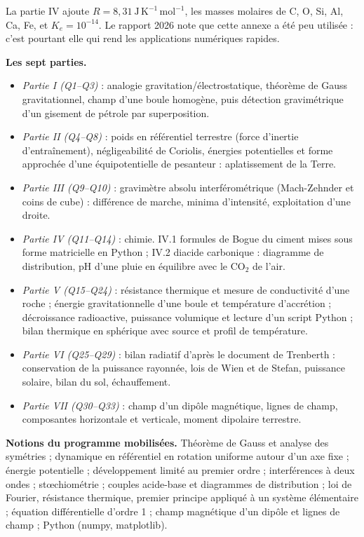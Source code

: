 \documentclass[11pt,a4paper]{article}
\providecommand{\tightlist}{\setlength{\itemsep}{0pt}\setlength{\parskip}{0pt}}
\begin{document}
La partie IV ajoute \(R=8{,}31\ \mathrm{J\,K^{-1}\,mol^{-1}}\), les masses molaires de C, O, Si, Al, Ca, Fe, et \(K_e=10^{-14}\). Le rapport 2026 note que cette annexe a été peu utilisée : c'est pourtant elle qui rend les applications numériques rapides.

\textbf{Les sept parties.}

\begin{itemize}
\tightlist
\item
  \emph{Partie I (Q1--Q3)} : analogie gravitation/électrostatique, théorème de Gauss gravitationnel, champ d'une boule homogène, puis détection gravimétrique d'un gisement de pétrole par superposition.
\item
  \emph{Partie II (Q4--Q8)} : poids en référentiel terrestre (force d'inertie d'entraînement), négligeabilité de Coriolis, énergies potentielles et forme approchée d'une équipotentielle de pesanteur : aplatissement de la Terre.
\item
  \emph{Partie III (Q9--Q10)} : gravimètre absolu interférométrique (Mach-Zehnder et coins de cube) : différence de marche, minima d'intensité, exploitation d'une droite.
\item
  \emph{Partie IV (Q11--Q14)} : chimie. IV.1 formules de Bogue du ciment mises sous forme matricielle en Python ; IV.2 diacide carbonique : diagramme de distribution, pH d'une pluie en équilibre avec le \(\mathrm{CO_2}\) de l'air.
\item
  \emph{Partie V (Q15--Q24)} : résistance thermique et mesure de conductivité d'une roche ; énergie gravitationnelle d'une boule et température d'accrétion ; décroissance radioactive, puissance volumique et lecture d'un script Python ; bilan thermique en sphérique avec source et profil de température.
\item
  \emph{Partie VI (Q25--Q29)} : bilan radiatif d'après le document de Trenberth : conservation de la puissance rayonnée, lois de Wien et de Stefan, puissance solaire, bilan du sol, échauffement.
\item
  \emph{Partie VII (Q30--Q33)} : champ d'un dipôle magnétique, lignes de champ, composantes horizontale et verticale, moment dipolaire terrestre.
\end{itemize}

\textbf{Notions du programme mobilisées.} Théorème de Gauss et analyse des symétries ; dynamique en référentiel en rotation uniforme autour d'un axe fixe ; énergie potentielle ; développement limité au premier ordre ; interférences à deux ondes ; stœchiométrie ; couples acide-base et diagrammes de distribution ; loi de Fourier, résistance thermique, premier principe appliqué à un système élémentaire ; équation différentielle d'ordre 1 ; champ magnétique d'un dipôle et lignes de champ ; Python (numpy, matplotlib).
\end{document}
